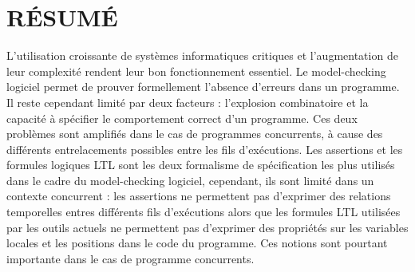 %
%
\chapter*{RÉSUMÉ}\thispagestyle{headings}



L'utilisation croissante de systèmes informatiques critiques et l'augmentation
de leur complexité rendent leur bon fonctionnement essentiel. Le model-checking
logiciel permet de prouver formellement l'absence d'erreurs dans un programme.
Il reste cependant limité par deux facteurs : l'explosion combinatoire et la
capacité à spécifier le comportement correct d'un programme. Ces deux problèmes
sont amplifiés dans le cas de programmes concurrents, à cause des différents
entrelacements possibles entre les fils d'exécutions. Les assertions et les
formules logiques LTL sont les deux formalisme de spécification les plus
utilisés dans le cadre du model-checking logiciel, cependant, ils sont limité
dans un contexte concurrent : les assertions ne permettent pas d'exprimer des
relations temporelles entres différents fils d'exécutions alors que les formules
LTL utilisées par les outils actuels ne permettent pas d'exprimer des propriétés
sur les variables locales et les positions dans le code du programme. Ces
notions sont pourtant importante dans le cas de programme concurrents.

